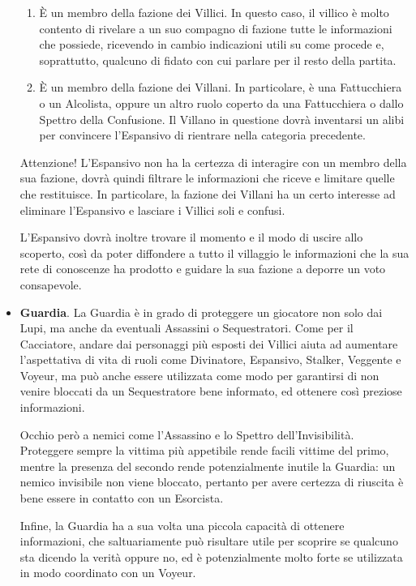 \documentclass[a4paper,10pt]{article}
\begin{document}
\begin{itemize}
	\begin{enumerate}
	    \item È un membro della fazione dei Villici. In questo caso, il villico è molto contento di rivelare a un suo compagno di fazione tutte le informazioni che possiede, ricevendo in cambio indicazioni utili su come procede e, soprattutto, qualcuno di fidato con cui parlare per il resto della partita.
	    \item È un membro della fazione dei Villani. In particolare, è una Fattucchiera o un Alcolista, oppure un altro ruolo coperto da una Fattucchiera o dallo Spettro della Confusione. Il Villano in questione dovrà inventarsi un alibi per convincere l'Espansivo di rientrare nella categoria precedente.
	\end{enumerate}
	
	Attenzione! L'Espansivo non ha la certezza di interagire con un membro della sua fazione, dovrà quindi filtrare le informazioni che riceve e limitare quelle che restituisce. In particolare, la fazione dei Villani ha un certo interesse ad eliminare l'Espansivo e lasciare i Villici soli e confusi.

    L'Espansivo dovrà inoltre trovare il momento e il modo di uscire allo scoperto, così da poter diffondere a tutto il villaggio le informazioni che la sua rete di conoscenze ha prodotto e guidare la sua fazione a deporre un voto consapevole.
	
	\item {\bf Guardia}. La Guardia è in grado di proteggere un giocatore non solo dai Lupi, ma anche da eventuali Assassini o Sequestratori. Come per il Cacciatore, andare dai personaggi più esposti dei Villici aiuta ad aumentare l'aspettativa di vita di ruoli come Divinatore, Espansivo, Stalker, Veggente e Voyeur, ma può anche essere utilizzata come modo per garantirsi di non venire bloccati da un Sequestratore bene informato, ed ottenere così preziose informazioni.
	
    Occhio però a nemici come l'Assassino e lo Spettro dell'Invisibilità. Proteggere sempre la vittima più appetibile rende facili vittime del primo, mentre la presenza del secondo rende potenzialmente inutile la Guardia: un nemico invisibile non viene bloccato, pertanto per avere certezza di riuscita è bene essere in contatto con un Esorcista.
	
	Infine, la Guardia ha a sua volta una piccola capacità di ottenere informazioni, che saltuariamente può risultare utile per scoprire se qualcuno sta dicendo la verità oppure no, ed è potenzialmente molto forte se utilizzata in modo coordinato con un Voyeur.
	

\end{itemize}
\end{document}
